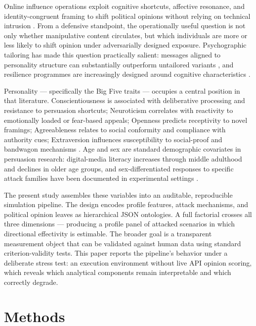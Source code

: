 \documentclass[11pt,a4paper]{article}
\begin{document}
Online influence operations exploit cognitive shortcuts, affective resonance, and identity-congruent framing to shift political opinions without relying on technical intrusion \citep{bennett2018disinformation,lazer2018science,lewandowsky2017posttruth}. From a defensive standpoint, the operationally useful question is not only whether manipulative content circulates, but which individuals are more or less likely to shift opinion under adversarially designed exposure. Psychographic tailoring has made this question practically salient: messages aligned to personality structure can substantially outperform untailored variants \citep{matz2017psychological}, and resilience programmes are increasingly designed around cognitive characteristics \citep{kozyreva2020citizens,roozenbeek2022psychological,pennycook2021psychology}.

Personality — specifically the Big Five traits — occupies a central position in that literature. Conscientiousness is associated with deliberative processing and resistance to persuasion shortcuts; Neuroticism correlates with reactivity to emotionally loaded or fear-based appeals; Openness predicts receptivity to novel framings; Agreeableness relates to social conformity and compliance with authority cues; Extraversion influences susceptibility to social-proof and bandwagon mechanisms \citep{pennycook2019lazy,pennycook2021psychology}. Age and sex are standard demographic covariates in persuasion research: digital-media literacy increases through middle adulthood and declines in older age groups, and sex-differentiated responses to specific attack families have been documented in experimental settings \citep{kozyreva2020citizens}.

The present study assembles these variables into an auditable, reproducible simulation pipeline. The design encodes profile features, attack mechanisms, and political opinion leaves as hierarchical JSON ontologies. A full factorial crosses all three dimensions — producing a profile panel of attacked scenarios in which directional effectivity is estimable. The broader goal is a transparent measurement object that can be validated against human data using standard criterion-validity tests. This paper reports the pipeline's behavior under a deliberate stress test: an execution environment without live API opinion scoring, which reveals which analytical components remain interpretable and which correctly degrade.

\section{Methods}
\end{document}
